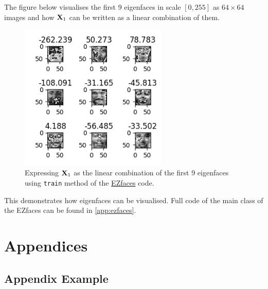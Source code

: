 \documentclass[a4paper]{article}
\begin{document}
The figure below visualises the first 9 eigenfaces in scale $[0,255]$ as $64\times 64$ images and how $\textbf{X}_1$ can be written as a linear combination of them.
\begin{figure}[H]
	\centering
	\includegraphics[height=7cm]{img/sum_of_eigenfaces.png}
	\caption{Expressing $\textbf{X}_1$ as the linear combination of the first 9 eigenfaces using \texttt{train} method of the \href{https://github.com/0xLeo/EZfaces}{EZfaces} code.}
\end{figure}
This demonstrates how eigenfaces can be visualised. Full code of the main class of the EZfaces can be found in \ref{app:ezfaces}.

\newpage
\printbibliography



\newpage
\appendix

\section{Appendices}

\newpage
\subsection{Appendix Example}
\label{app:my_pca_matlab}


\end{document}
